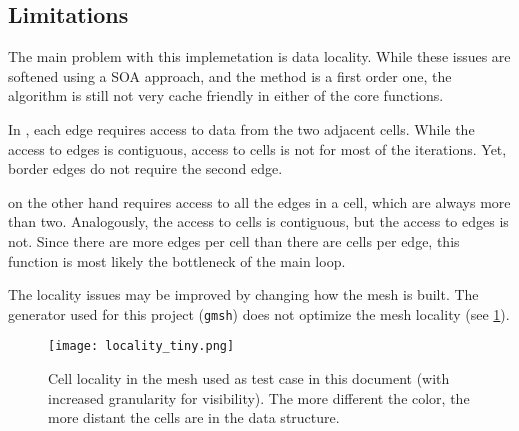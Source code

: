 \subsection{Limitations}
\label{sec:omp:limitations}

The main problem with this implemetation is data locality. While these issues are softened using a SOA approach, and the method is a first order one, the algorithm is still not very cache friendly in either of the core functions.

In \computeflux, each edge requires access to data from the two adjacent cells. While the access to edges is contiguous, access to cells is not for most of the iterations. Yet, border edges do not require the second edge.

\update on the other hand requires access to all the edges in a cell, which are always more than two. Analogously, the access to cells is contiguous, but the access to edges is not. Since there are more edges per cell than there are cells per edge, this function is most likely the bottleneck of the main loop.

The locality issues may be improved by changing how the mesh is built. The generator used for this project (\texttt{gmsh}) does not optimize the mesh locality (see \cref{fig:locality}).


\begin{figure}[!htp]
	\centering
	\texttt{[image: locality\_tiny.png]}
	\caption{Cell locality in the mesh used as test case in this document (with increased granularity for visibility). The more different the color, the more distant the cells are in the data structure.}
	\label{fig:locality}
\end{figure}
